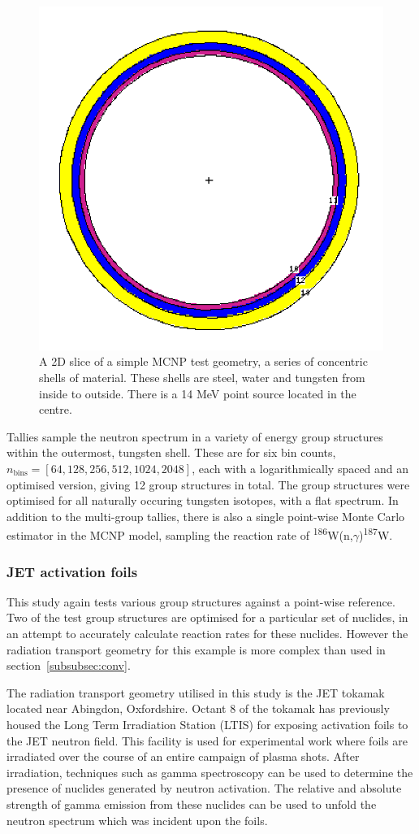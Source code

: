 \begin{figure}[H]
  \centering
  \includegraphics[width=0.7\linewidth]{conv_mcnp}
  \caption{A 2D slice of a simple MCNP test geometry, a series of concentric shells of material. These shells are steel, water and tungsten from inside to outside. There is a 14 MeV point source located in the centre.}
  \label{fig:conv_mcnp}
\end{figure}

Tallies sample the neutron spectrum in a variety of energy group structures within the outermost, tungsten shell. These are for six bin counts, $n_\mathrm{bins} = [64,128,256,512,1024,2048]$, each with a logarithmically spaced and an optimised version, giving 12 group structures in total. The group structures were optimised for all naturally occuring tungsten isotopes, with a flat spectrum. In addition to the multi-group tallies, there is also a single point-wise Monte Carlo estimator in the MCNP model, sampling the reaction rate of \textsuperscript{186}W(n,$\gamma$)\textsuperscript{187}W.

\subsubsection{JET activation foils}
\label{subsubsec:jet}
This study again tests various group structures against a point-wise reference. Two of the test group structures are optimised for a particular set of nuclides, in an attempt to accurately calculate reaction rates for these nuclides. However the radiation transport geometry for this example is more complex than used in section~\ref{subsubsec:conv}. 

The radiation transport geometry utilised in this study is the JET tokamak located near Abingdon, Oxfordshire. Octant 8 of the tokamak has previously housed the Long Term Irradiation Station (LTIS) for exposing activation foils to the JET neutron field. This facility is used for experimental work where foils are irradiated over the course of an entire campaign of plasma shots. After irradiation, techniques such as gamma spectroscopy can be used to determine the presence of nuclides generated by neutron activation. The relative and absolute strength of gamma emission from these nuclides can be used to unfold the neutron spectrum which was incident upon the foils.

